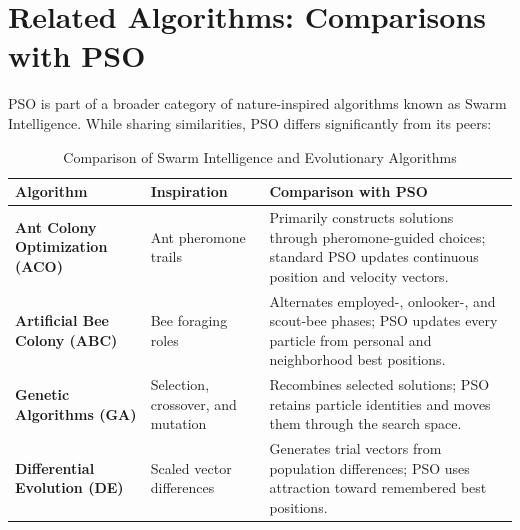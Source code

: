 \documentclass[12pt,a4paper]{article}
\begin{document}
\section{Related Algorithms: Comparisons with PSO}
PSO is part of a broader category of nature-inspired algorithms known as Swarm Intelligence. While sharing similarities, PSO differs significantly from its peers:

\begin{table}[htbp]
\centering
\small
\setlength{\tabcolsep}{6pt}
\renewcommand{\arraystretch}{1.18}
\begin{tabularx}{\textwidth}{@{}>{\raggedright\arraybackslash\bfseries}p{}>{\raggedright\arraybackslash}p{}>{\raggedright\arraybackslash}X@{}}
\toprule
Algorithm & \textbf{Inspiration} & \textbf{Comparison with PSO} \\ 
\midrule
Ant Colony Optimization (ACO) & Ant pheromone trails \cite{dorigo1996} & Primarily constructs solutions through pheromone-guided choices; standard PSO updates continuous position and velocity vectors. \\ 
Artificial Bee Colony (ABC) & Bee foraging roles \cite{karaboga2005} & Alternates employed-, onlooker-, and scout-bee phases; PSO updates every particle from personal and neighborhood best positions. \\ 
Genetic Algorithms (GA) & Selection, crossover, and mutation \cite{mitchell1998introduction} & Recombines selected solutions; PSO retains particle identities and moves them through the search space. \\ 
Differential Evolution (DE) & Scaled vector differences \cite{storn1997} & Generates trial vectors from population differences; PSO uses attraction toward remembered best positions. \\ 
\bottomrule
\end{tabularx}
\caption{Comparison of Swarm Intelligence and Evolutionary Algorithms}
\label{tab:comparisons}
\end{table}
\end{document}
